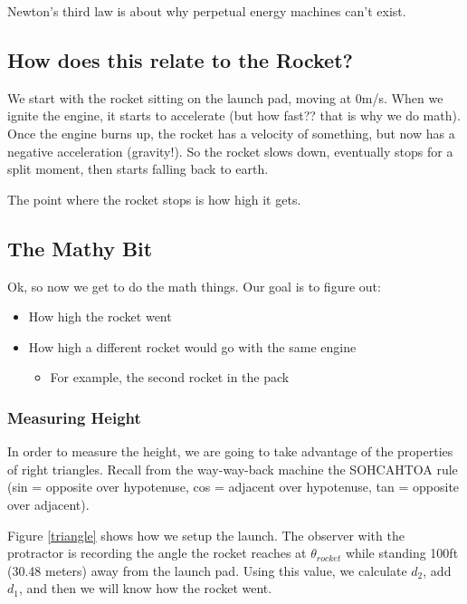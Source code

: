 \documentclass{article}
\begin{document}
Newton's third law is about why perpetual energy machines can't exist.

\subsection{How does this relate to the Rocket?}

We start with the rocket sitting on the launch pad, moving at 0m/s.
When we ignite the engine, it starts to accelerate (but how fast?? that is why we do math).
Once the engine burns up, the rocket has a velocity of something, but now has a negative acceleration (gravity!).
So the rocket slows down, eventually stops for a split moment, then starts falling back to earth.

The point where the rocket stops is how high it gets.

\subsection{The Mathy Bit}

Ok, so now we get to do the math things.
Our goal is to figure out:
\begin{itemize}
	\item How high the rocket went
	\item How high a different rocket would go with the same engine
	\begin{itemize}
		\item For example, the second rocket in the pack
	\end{itemize}
\end{itemize}

\subsubsection{Measuring Height}

In order to measure the height, we are going to take advantage of the properties of right triangles.
Recall from the way-way-back machine the SOHCAHTOA rule (sin = opposite over hypotenuse, cos = adjacent over hypotenuse, tan = opposite over adjacent).

Figure \ref{triangle} shows how we setup the launch.
The observer with the protractor is recording the angle the rocket reaches at $\theta_{rocket}$ while standing 100ft (30.48 meters) away from the launch pad.
Using this value, we calculate $d_2$, add $d_1$, and then we will know how the rocket went. \\
\end{document}

